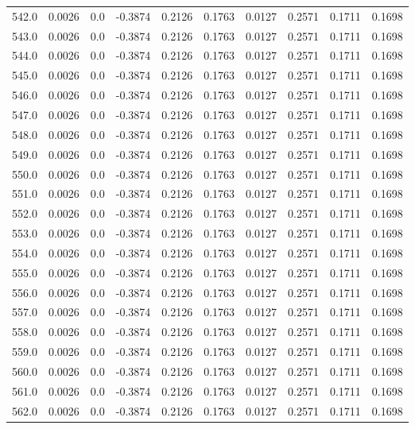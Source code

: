 \begin{longtable}{lrrrrrrrrr}
542.0 & 0.0026 & 0.0 & -0.3874 & 0.2126 & 0.1763 & 0.0127 & 0.2571 & 0.1711 & 0.1698 \\
543.0 & 0.0026 & 0.0 & -0.3874 & 0.2126 & 0.1763 & 0.0127 & 0.2571 & 0.1711 & 0.1698 \\
544.0 & 0.0026 & 0.0 & -0.3874 & 0.2126 & 0.1763 & 0.0127 & 0.2571 & 0.1711 & 0.1698 \\
545.0 & 0.0026 & 0.0 & -0.3874 & 0.2126 & 0.1763 & 0.0127 & 0.2571 & 0.1711 & 0.1698 \\
546.0 & 0.0026 & 0.0 & -0.3874 & 0.2126 & 0.1763 & 0.0127 & 0.2571 & 0.1711 & 0.1698 \\
547.0 & 0.0026 & 0.0 & -0.3874 & 0.2126 & 0.1763 & 0.0127 & 0.2571 & 0.1711 & 0.1698 \\
548.0 & 0.0026 & 0.0 & -0.3874 & 0.2126 & 0.1763 & 0.0127 & 0.2571 & 0.1711 & 0.1698 \\
549.0 & 0.0026 & 0.0 & -0.3874 & 0.2126 & 0.1763 & 0.0127 & 0.2571 & 0.1711 & 0.1698 \\
550.0 & 0.0026 & 0.0 & -0.3874 & 0.2126 & 0.1763 & 0.0127 & 0.2571 & 0.1711 & 0.1698 \\
551.0 & 0.0026 & 0.0 & -0.3874 & 0.2126 & 0.1763 & 0.0127 & 0.2571 & 0.1711 & 0.1698 \\
552.0 & 0.0026 & 0.0 & -0.3874 & 0.2126 & 0.1763 & 0.0127 & 0.2571 & 0.1711 & 0.1698 \\
553.0 & 0.0026 & 0.0 & -0.3874 & 0.2126 & 0.1763 & 0.0127 & 0.2571 & 0.1711 & 0.1698 \\
554.0 & 0.0026 & 0.0 & -0.3874 & 0.2126 & 0.1763 & 0.0127 & 0.2571 & 0.1711 & 0.1698 \\
555.0 & 0.0026 & 0.0 & -0.3874 & 0.2126 & 0.1763 & 0.0127 & 0.2571 & 0.1711 & 0.1698 \\
556.0 & 0.0026 & 0.0 & -0.3874 & 0.2126 & 0.1763 & 0.0127 & 0.2571 & 0.1711 & 0.1698 \\
557.0 & 0.0026 & 0.0 & -0.3874 & 0.2126 & 0.1763 & 0.0127 & 0.2571 & 0.1711 & 0.1698 \\
558.0 & 0.0026 & 0.0 & -0.3874 & 0.2126 & 0.1763 & 0.0127 & 0.2571 & 0.1711 & 0.1698 \\
559.0 & 0.0026 & 0.0 & -0.3874 & 0.2126 & 0.1763 & 0.0127 & 0.2571 & 0.1711 & 0.1698 \\
560.0 & 0.0026 & 0.0 & -0.3874 & 0.2126 & 0.1763 & 0.0127 & 0.2571 & 0.1711 & 0.1698 \\
561.0 & 0.0026 & 0.0 & -0.3874 & 0.2126 & 0.1763 & 0.0127 & 0.2571 & 0.1711 & 0.1698 \\
562.0 & 0.0026 & 0.0 & -0.3874 & 0.2126 & 0.1763 & 0.0127 & 0.2571 & 0.1711 & 0.1698 \\

\end{longtable}
